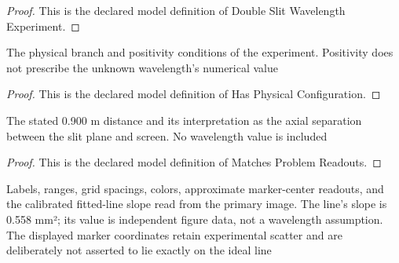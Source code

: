 \begin{proof}
  This is the declared model definition of Double Slit Wavelength Experiment.
\end{proof}
\begin{definition}
  \label{def:physics:phyx-mini-0119:phyxminiproblems-problemphyxmini0119-hasphysicalconfiguration}
  The physical branch and positivity conditions of the experiment. Positivity does not prescribe the unknown wavelength's numerical value
\end{definition}
\begin{proof}
  This is the declared model definition of Has Physical Configuration.
\end{proof}
\begin{definition}
  \label{def:physics:phyx-mini-0119:phyxminiproblems-problemphyxmini0119-matchesproblemreadouts}
  The stated 0.900 m distance and its interpretation as the axial separation between the slit plane and screen. No wavelength value is included
\end{definition}
\begin{proof}
  This is the declared model definition of Matches Problem Readouts.
\end{proof}
\begin{definition}
  \label{def:physics:phyx-mini-0119:phyxminiproblems-problemphyxmini0119-matchessuppliedplot}
  Labels, ranges, grid spacings, colors, approximate marker-center readouts, and the calibrated fitted-line slope read from the primary image. The line's slope is 0.558 mm²; its value is independent figure data, not a wavelength assumption. The displayed marker coordinates retain experimental scatter and are deliberately not asserted to lie exactly on the ideal line
\end{definition}
